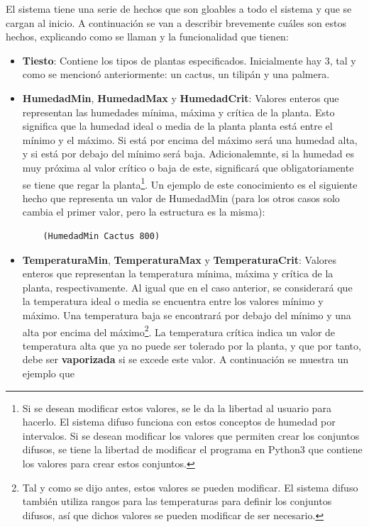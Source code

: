 \documentclass[11pt,a4paper]{article}
\begin{document}
El sistema tiene una serie de hechos que son gloables a todo el sistema y que se cargan al inicio. A continuación se van a describir
brevemente cuáles son estos hechos, explicando como se llaman y la funcionalidad que tienen:

\begin{itemize}
	\item \textbf{Tiesto}: Contiene los tipos de plantas especificados. Inicialmente hay 3, tal y como se mencionó anteriormente:
	un cactus, un tilipán y una palmera.
	\item \textbf{HumedadMin}, \textbf{HumedadMax} y \textbf{HumedadCrit}: Valores enteros que representan las humedades mínima,
	máxima y crítica de la planta. Esto significa que la humedad ideal o media de la planta planta está entre el mínimo y el máximo.
	Si está por encima del máximo será una humedad alta, y si está por debajo del mínimo será baja. Adicionalemnte, si la humedad
	es muy próxima al valor crítico o baja de este, significará que obligatoriamente se tiene que regar la planta\footnote{Si se
	desean modificar estos valores, se le da la libertad al usuario para hacerlo. El sistema difuso funciona con estos conceptos
	de humedad por intervalos. Si se desean modificar los valores que permiten crear los conjuntos difusos, se tiene la libertad
	de modificar el programa en Python3 que contiene los valores para crear estos conjuntos.}. Un ejemplo de este conocimiento es
	el siguiente hecho que representa un valor de HumedadMin (para los otros casos solo cambia el primer valor, pero la estructura
	es la misma):
\begin{lstlisting}
	(HumedadMin Cactus 800)
\end{lstlisting}
	\item \textbf{TemperaturaMin}, \textbf{TemperaturaMax} y \textbf{TemperaturaCrit}: Valores enteros que representan la temperatura
	mínima, máxima y crítica de la planta, respectivamente. Al igual que en el caso anterior, se considerará que la temperatura
	ideal o media se encuentra entre los valores mínimo y máximo. Una temperatura baja se encontrará por debajo del mínimo y una
	alta por encima del máximo\footnote{Tal y como se dijo antes, estos valores se pueden modificar. El sistema difuso también
	utiliza rangos para las temperaturas para definir los conjuntos difusos, así que dichos valores se pueden modificar de ser
	necesario.}. La temperatura crítica indica un valor de temperatura alta que ya no puede ser tolerado por la
	planta, y que por tanto, debe ser \textbf{vaporizada} si se excede este valor. A continuación se muestra un ejemplo que

\end{itemize}
\end{document}
